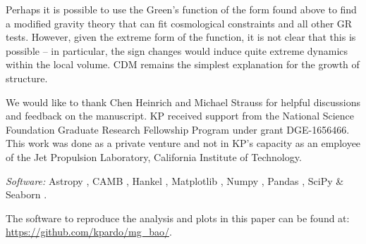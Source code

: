 \documentclass[floats,floatfix,showpacs,amssymb,amsmath,prl,twocolumn,superscriptaddress,nofootinbib, aps]{revtex4-2}
\newcommand{\kris}[1]{\textcolor{TealBlue}{[{\bf KP says}: #1]}}
\begin{document}

Perhaps it is possible to use the Green's function of the form found above to find a modified gravity theory that can fit cosmological constraints and all other GR tests. However, given the extreme form of the function, it is not clear that this is possible -- in particular, the sign changes would induce quite extreme dynamics within the local volume. CDM remains the simplest explanation for the growth of structure.

\acknowledgements
We would like to thank Chen Heinrich and Michael Strauss for helpful discussions and feedback on the manuscript. KP received support from the National Science Foundation Graduate Research Fellowship Program under grant DGE-1656466. This work was done as a private venture and not in KP's capacity as an employee of the Jet Propulsion Laboratory, California Institute of Technology.

\textit{Software:} Astropy \citep{astropy:2013, astropy:2018}, CAMB \citep{camb}, Hankel \citep{hankel}, Matplotlib \citep{Hunter:2007}, Numpy \citep{numpy}, Pandas \citep{pandas, mckinney-proc-scipy-2010}, SciPy \citep{scipy} \& Seaborn \citep{seaborn}.

The software to reproduce the analysis and plots in this paper can be found at: \url{https://github.com/kpardo/mg_bao/}.



\end{document}
